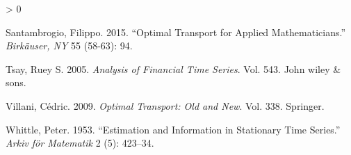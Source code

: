 \documentclass[
  11pt,
]{article}
\newlength{\cslhangindent}
\newenvironment{CSLReferences}[2] %
 {%
  \setlength{\parindent}{0pt}
  \ifodd #1 \everypar{\setlength{\hangindent}{\cslhangindent}}\ignorespaces\fi
  \ifnum #2 > 0
  \setlength{\parskip}{#2\baselineskip}
  \fi
 }%
 {}
\begin{document}
\begin{CSLReferences}{1}{0}
\leavevmode\hypertarget{ref-santambrogio2015optimal}{}%
Santambrogio, Filippo. 2015. {``Optimal Transport for Applied
Mathematicians.''} \emph{Birk{ä}user, NY} 55 (58-63): 94.

\leavevmode\hypertarget{ref-tsay2005analysis}{}%
Tsay, Ruey S. 2005. \emph{Analysis of Financial Time Series}. Vol. 543.
John wiley \& sons.

\leavevmode\hypertarget{ref-villani2009optimal}{}%
Villani, Cédric. 2009. \emph{Optimal Transport: Old and New}. Vol. 338.
Springer.

\leavevmode\hypertarget{ref-whittle1953estimation}{}%
Whittle, Peter. 1953. {``Estimation and Information in Stationary Time
Series.''} \emph{Arkiv f{ö}r Matematik} 2 (5): 423--34.

\end{CSLReferences}
\end{document}
